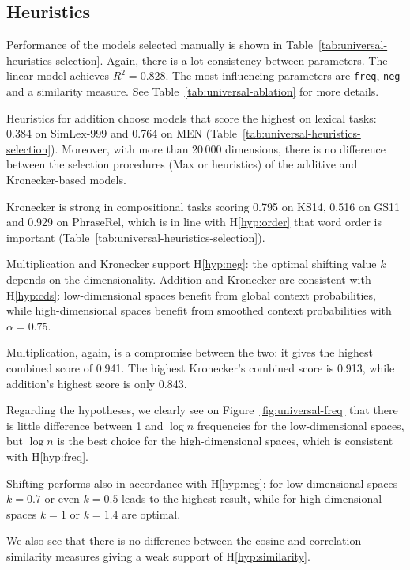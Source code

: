 \subsection{Heuristics}
\label{sec:heuristics-universal}



Performance of the models selected manually is shown in Table~\ref{tab:universal-heuristics-selection}. Again, there is a lot consistency between parameters. The linear model achieves $R^2 = 0.828$. The most influencing parameters are \texttt{freq}, \texttt{neg} and a similarity measure. See Table~\ref{tab:universal-ablation} for more details.

Heuristics for addition choose models that score the highest on lexical tasks: 0.384 on SimLex-999 and 0.764 on MEN (Table~\ref{tab:universal-heuristics-selection}). Moreover, with more than 20\,000 dimensions, there is no difference between the selection procedures (Max or heuristics) of the additive and Kronecker-based models.

Kronecker is strong in compositional tasks scoring 0.795 on KS14, 0.516 on GS11 and 0.929 on PhraseRel, which is in line with H\ref{hyp:order} that word order is important (Table~\ref{tab:universal-heuristics-selection}).

Multiplication and Kronecker support H\ref{hyp:neg}: the optimal shifting value $k$ depends on the dimensionality. Addition and Kronecker are consistent with H\ref{hyp:cds}: low-dimensional spaces benefit from global context probabilities, while high-dimensional spaces benefit from smoothed context probabilities with $\alpha=0.75$.

Multiplication, again, is a compromise between the two: it gives the highest combined score of 0.941. The highest Kronecker's combined score is 0.913, while addition's highest score is only 0.843.

Regarding the hypotheses, we clearly see on Figure~\ref{fig:universal-freq} that there is little difference between 1 and $\log n$ frequencies for the low-dimensional spaces, but $\log n$ is the best choice for the high-dimensional spaces, which is consistent with H\ref{hyp:freq}.

Shifting performs also in accordance with H\ref{hyp:neg}: for low-dimensional spaces $k=0.7$ or even $k=0.5$ leads to the highest result, while for high-dimensional spaces $k=1$ or $k=1.4$ are optimal.

We also see that there is no difference between the cosine and correlation similarity measures giving a weak support of H\ref{hyp:similarity}.

